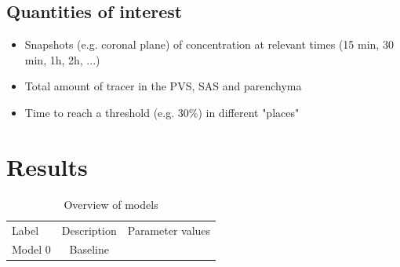 \documentclass[fleqn,10pt]{wlscirep}
\begin{document}
\subsection*{Quantities of interest}

\begin{itemize}
    \item Snapshots (e.g. coronal plane) of concentration at relevant times (15 min, 30 min, 1h, 2h, ...) 
    \item Total amount of tracer in the PVS, SAS and parenchyma
     \item Time to reach a threshold (e.g. 30\%) in different "places"
\end{itemize}

\section*{Results}

\begin{table}
\begin{center}
    \begin{tabular}{l|cc}
    \toprule
    Label & Description & Parameter values \\
    Model 0 & Baseline &  \\
    \bottomrule
    \end{tabular}
    \end{center}
    \caption{Overview of models}
\end{table}
\end{document}
